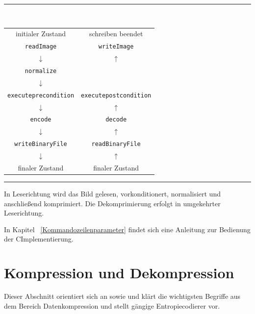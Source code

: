\documentclass[a4paper,12pt]{article}
\newcommand{\CC}{C\nolinebreak\hspace{-.05em}\raisebox{.4ex}{\tiny\bf+}\nolinebreak\hspace{-.10em}\raisebox{.4ex}{\tiny\bf+}\;}
\begin{document}
\begin{center}
{\color{gray!50!blue}\rule{9cm}{0.1mm}}
\vspace{0.2cm}
\\
\begin{tabular}{c c}
initialer Zustand & schreiben beendet 
\\
{\tt{readImage}} & {\tt{writeImage}}
\\
$\downarrow$ & $\uparrow$ 
\\
{\tt{normalize}} & 
\\
$\downarrow$ & 
\\
{\tt{execute{\tt{pre}}condition}} & {\tt{execute{\tt{post}}condition}}
\\
$\downarrow$ & $\uparrow$ 
\\
{\tt{encode}} & {\tt{decode}}
\\
$\downarrow$ & $\uparrow$ 
\\
{\tt{writeBinaryFile}} & {\tt{readBinaryFile}}
\\
$\downarrow$ & $\uparrow$ 
\\
finaler Zustand & finaler Zustand
\end{tabular}
{\color{gray!50!red}\rule{9cm}{0.1mm}}
\vspace{0.5cm}
\end{center}
In Leserichtung wird das Bild gelesen, vorkonditionert, normalisiert und 
anschließend komprimiert.
Die Dekomprimierung erfolgt in umgekehrter Leserichtung. 
\par
In Kapitel ~\ref{Kommandozeilenparameter} findet sich eine Anleitung zur Bedienung der \CC Implementierung.
\newpage
\section{Kompression und Dekompression}
Dieser Abschnitt orientiert sich an\cite{henne} sowie \cite{Lajmi} und klärt die wichtigsten Begriffe aus dem Bereich Datenkompression und stellt gängige Entropiecodierer vor.
\end{document}
